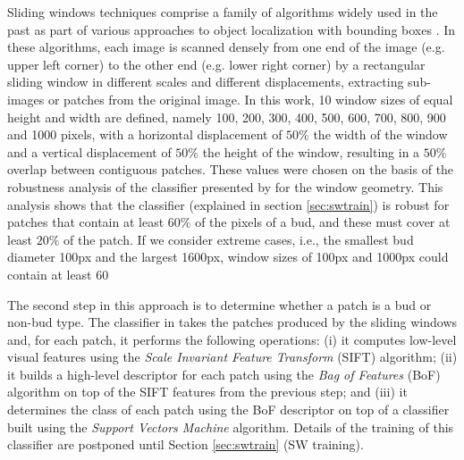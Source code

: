 \documentclass[a4paper,authoryear,review]{elsarticle}
\begin{document}
Sliding windows techniques comprise a family of algorithms widely used in the past as part of various approaches to object localization with bounding boxes \citep{divvala2009empirical, wang2009hog, chum2007exemplar, ferrari2007groups, dalal2005histograms, rowley1996human}. In these algorithms, each image is scanned densely from one end of the image (e.g. upper left corner) to the other end (e.g. lower right corner) by a rectangular sliding window in different scales and different displacements, extracting sub-images or patches from the original image. In this work, 10 window sizes of equal height and width are defined, namely 100, 200, 300, 400, 500, 600, 700, 800, 900 and 1000 pixels, with a horizontal displacement of $50\%$ the width of the window and a vertical displacement of $50\%$ the height of the window, resulting in a $50\%$ overlap between contiguous patches. These values were chosen on the basis of the robustness analysis of the classifier presented by \citet{perez2017image} for the window geometry. This analysis shows that the classifier (explained in section \ref{sec:swtrain}) is robust for patches that contain at least $60\%$ of the pixels of a bud, and these must cover at least $20\%$ of the patch. If we consider extreme cases, i.e., the smallest bud diameter 100px and the largest 1600px, window sizes of 100px and 1000px could contain at least 60%

The second step in this approach is to determine whether a patch is a bud or non-bud type. The classifier in  \citet{perez2017image} takes the patches produced by the sliding windows and, for each patch, it performs the following operations: (i) it computes low-level visual features using the \emph{Scale Invariant Feature Transform} (SIFT) \citet{lowe2004distinctive} algorithm; (ii) it builds a high-level descriptor for each patch using the \emph{Bag of Features} (BoF) \citet{csurka2004visual} algorithm on top of the SIFT features from the previous step; and (iii) it determines the class of each patch using the BoF descriptor on top of a classifier built using the \emph{Support Vectors Machine} \citet{vapnik2013nature} algorithm. Details of the training of this classifier are postponed until Section \ref{sec:swtrain} (SW training).
\end{document}
